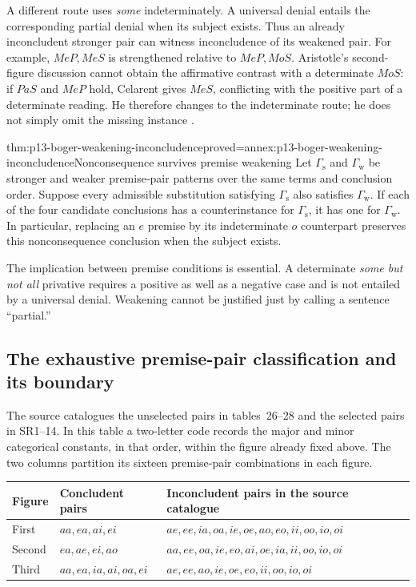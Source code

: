 A different route uses \emph{some} indeterminately. A universal denial entails
the corresponding partial denial when its subject exists. Thus an already
inconcludent stronger pair can witness inconcludence of its weakened pair.
For example, \(MeP,MeS\) is strengthened relative to \(MeP,MoS\).
Aristotle's second-figure discussion cannot obtain the affirmative contrast
with a determinate \(MoS\): if \(PaS\) and \(MeP\) hold, Celarent gives
\(MeS\), conflicting with the positive part of a determinate reading. He
therefore changes to the indeterminate route; he does not simply omit the
missing instance \parencite[pp.~195--197]{Boger2004UnderlyingLogic}.

\begin{hbtheorem}{thm:p13-boger-weakening-inconcludence}{proved=annex:p13-boger-weakening-inconcludence}{Nonconsequence survives premise weakening}
Let \(\Gamma_{\mathrm{s}}\) and \(\Gamma_{\mathrm{w}}\) be stronger and weaker
premise-pair patterns over the same terms and conclusion order. Suppose every
admissible substitution satisfying \(\Gamma_{\mathrm{s}}\) also satisfies
\(\Gamma_{\mathrm{w}}\). If each of the four candidate conclusions has a
counterinstance for \(\Gamma_{\mathrm{s}}\), it has one for
\(\Gamma_{\mathrm{w}}\). In particular, replacing an \(e\) premise by its
indeterminate \(o\) counterpart preserves this nonconsequence conclusion
when the subject exists.
\end{hbtheorem}

The implication between premise conditions is essential. A determinate
\emph{some but not all} privative requires a positive as well as a negative
case and is not entailed by a universal denial. Weakening cannot be justified
just by calling a sentence ``partial.''

\subsection{The exhaustive premise-pair classification and its boundary}
\label{sec:p13-boger-pair-catalogue}

The source catalogues the unselected pairs in tables~26--28 and the selected
pairs in SR1--14. In this table a two-letter code records the major and minor
categorical constants, in that order, within the figure already fixed above.
The two columns partition its sixteen premise-pair combinations in each figure.

\begin{tabularx}{\textwidth}{@{}l l X@{}}
\toprule
Figure & Concludent pairs & Inconcludent pairs in the source catalogue\\
\midrule
First & \(aa,ea,ai,ei\) & \(ae,ee,ia,oa,ie,oe,ao,eo,ii,oo,io,oi\)\\
Second & \(ea,ae,ei,ao\) & \(aa,ee,oa,ie,eo,ai,oe,ia,ii,oo,io,oi\)\\
Third & \(aa,ea,ia,ai,oa,ei\) & \(ae,ee,ao,ie,oe,eo,ii,oo,io,oi\)\\
\bottomrule
\end{tabularx}

